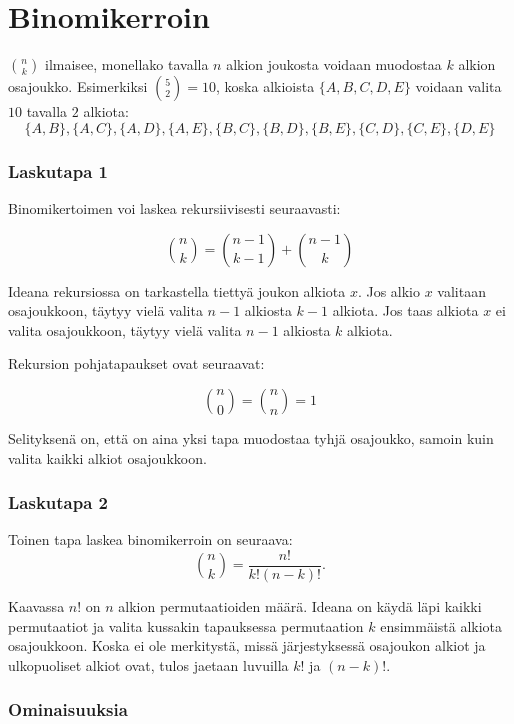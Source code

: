 \section{Binomikerroin}


 ${n \choose k}$ ilmaisee,
monellako tavalla $n$ alkion joukosta
voidaan muodostaa $k$ alkion osajoukko.
Esimerkiksi ${5 \choose 2}=10$,
koska alkioista $\{A,B,C,D,E\}$
voidaan valita $10$ tavalla $2$ alkiota:
\[ \{A,B\}, \{A,C\}, \{A,D\}, \{A,E\}, \{B,C\}, 
\{B,D\}, \{B,E\}, \{C,D\}, \{C,E\}, \{D,E\} \]

\subsubsection{Laskutapa 1}

Binomikertoimen voi laskea rekursiivisesti seuraavasti:

\[
{n \choose k}  =  {n-1 \choose k-1} + {n-1 \choose k}
\]

Ideana rekursiossa on tarkastella tiettyä
joukon alkiota $x$.
Jos alkio $x$ valitaan osajoukkoon,
täytyy vielä valita $n-1$ alkiosta $k-1$ alkiota.
Jos taas alkiota $x$ ei valita osajoukkoon,
täytyy vielä valita $n-1$ alkiosta $k$ alkiota.

Rekursion pohjatapaukset ovat seuraavat:

\[
{n \choose 0}  =  {n \choose n} = 1
\]

Selityksenä on, että on aina yksi tapa
muodostaa tyhjä osajoukko,
samoin kuin valita kaikki alkiot osajoukkoon.

\subsubsection{Laskutapa 2}

Toinen tapa laskea binomikerroin on seuraava:
\[
{n \choose k}  =  \frac{n!}{k!(n-k)!}.
\]

Kaavassa $n!$ on $n$ alkion permutaatioiden määrä.
Ideana on käydä läpi kaikki permutaatiot
ja valita kussakin tapauksessa
permutaation $k$ ensimmäistä alkiota osajoukkoon.
Koska ei ole merkitystä,
missä järjestyksessä osajoukon alkiot
ja ulkopuoliset alkiot ovat,
tulos jaetaan luvuilla $k!$ ja $(n-k)!$.

\subsubsection{Ominaisuuksia}

